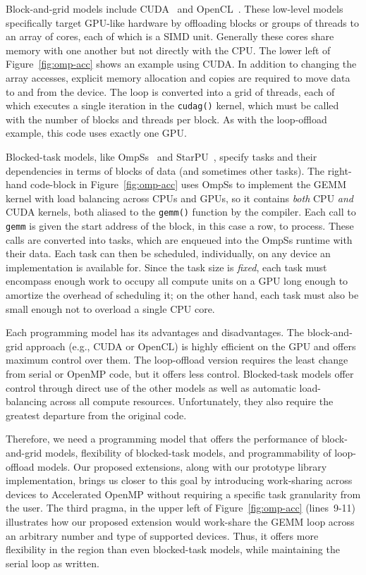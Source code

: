 Block-and-grid models include CUDA~\cite{nvidia2007cuda} and
OpenCL~\cite{opencl}. These low-level models specifically target
GPU-like hardware by offloading blocks or groups of threads to an array of
cores, each of which is a SIMD unit. Generally these cores share memory with
one another but not directly with the CPU. The lower left of
Figure~\ref{fig:omp-acc} shows an example using CUDA.  In addition to changing
the array accesses, explicit memory allocation and copies are required to move
data to and from the device. The loop is converted into a grid of threads,
each of which executes a single iteration in the \verb#cudag()# kernel, which
must be called with the number of blocks and threads per block. As with the
loop-offload example, this code uses exactly one GPU.

Blocked-task models, like OmpSs~\cite{DURAN:2011uy} and
StarPU~\cite{sips_starpu:_2009}, specify tasks and their dependencies in terms
of blocks of data (and sometimes other tasks). The right-hand code-block in
Figure~\ref{fig:omp-acc} uses OmpSs to implement the GEMM kernel with load
balancing across CPUs and GPUs, so it contains \emph{both} CPU \emph{and} CUDA
kernels, both aliased to the \verb#gemm()# function by the compiler.  Each
call to \verb#gemm# is given the start address of the block, in this case a
row, to process.  These calls are converted into tasks, which are enqueued
into the OmpSs runtime with their data.  Each task can then be scheduled,
individually, on any device an implementation is available for.  Since the
task size is \emph{fixed}, each task must encompass enough work to occupy all
compute units on a GPU long enough to amortize the overhead of scheduling it;
on the other hand, each task must also be small enough not to overload a
single CPU core.


Each programming model has its advantages and disadvantages.  The
block-and-grid approach (e.g., CUDA or OpenCL) is highly efficient on the GPU
and offers maximum control over them. The loop-offload version requires the
least change from serial or OpenMP code, but it offers less control.
Blocked-task models offer control through direct use of the other models as
well as automatic load-balancing across all compute resources.  Unfortunately,
they also require the greatest departure from the original code.

Therefore, we need a programming model that offers the performance of
block-and-grid models, flexibility of blocked-task models, and programmability
of loop-offload models. Our proposed extensions, along with our prototype
library implementation, brings us closer to this goal by introducing
work-sharing across devices to Accelerated OpenMP without requiring a specific
task granularity from the user.  The third pragma, in the upper left of
Figure~\ref{fig:omp-acc} (lines~9-11) illustrates how our proposed extension
would work-share the GEMM loop across an arbitrary number and type of
supported devices. Thus, it offers more flexibility in the region than even
blocked-task models, while maintaining the serial loop as written.

